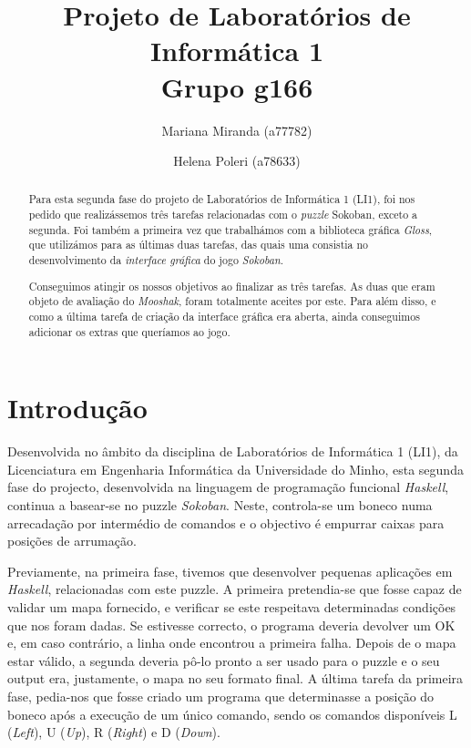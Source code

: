 \documentclass[a4paper]{article}
\title{Projeto de Laboratórios de Informática 1\\Grupo g166}
\author{Mariana Miranda (a77782) \and Helena Poleri (a78633)}
\begin{document}
\maketitle
\begin{abstract}
Para esta segunda fase do projeto de Laboratórios de Informática 1 (LI1), foi nos pedido que realizássemos três tarefas relacionadas com o \emph{puzzle} Sokoban, exceto a segunda. Foi também a primeira vez que trabalhámos com a biblioteca gráfica \emph{Gloss}, que utilizámos para as últimas duas tarefas, das quais uma consistia no desenvolvimento da \emph{interface gráfica} do jogo \emph{Sokoban}.

Conseguimos atingir os nossos objetivos ao finalizar as três tarefas. As duas que eram objeto de avaliação do \emph{Mooshak}, foram totalmente aceites por este. Para além disso, e como a última tarefa de criação da interface gráfica era aberta, ainda conseguimos adicionar os extras que queríamos ao jogo.
\end{abstract}
\newpage

\tableofcontents
\listoffigures
\listoftables

\newpage
\section{Introdução}
\label{sec:intro}

Desenvolvida no âmbito da disciplina de Laboratórios de Informática 1 (LI1), da Licenciatura em Engenharia Informática da Universidade do Minho, esta segunda fase do projecto, desenvolvida na linguagem de programação funcional \emph{Haskell}, continua a basear-se no puzzle \emph{Sokoban}. Neste, controla-se um boneco numa arrecadação por intermédio de comandos e o objectivo é empurrar caixas para posições de arrumação.

Previamente, na primeira fase, tivemos que desenvolver pequenas aplicações em \emph{Haskell}, relacionadas com este puzzle. A primeira pretendia-se que fosse capaz de validar um mapa fornecido, e verificar se este respeitava determinadas condições que nos foram dadas. Se estivesse correcto, o programa deveria devolver um OK e, em caso contrário, a linha onde encontrou a primeira falha. Depois de o mapa estar válido, a segunda deveria pô-lo pronto a ser usado para o puzzle e o seu output era, justamente, o mapa no seu formato final. A última tarefa da primeira fase, pedia-nos que fosse criado um programa que determinasse a posição do boneco após a execução de um único comando, sendo os comandos disponíveis L (\emph{Left}), U (\emph{Up}), R (\emph{Right}) e D (\emph{Down}).
\end{document}
